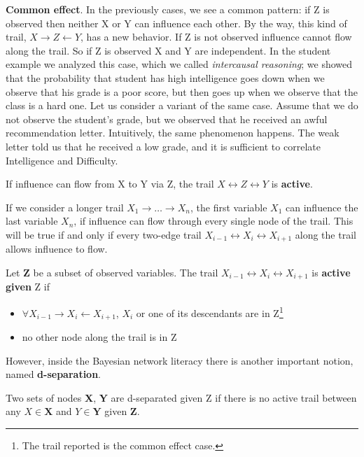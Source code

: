 \textbf{Common effect}. In the previously cases, we see a common pattern: if Z is observed then neither X or Y can influence each other. By the way, this kind of trail, 
$X \rightarrow Z \leftarrow Y$, has a new behavior. If Z is not observed influence cannot flow along the trail. So if Z is observed X and Y are independent. In the student example
we analyzed this case, which we called \textit{intercausal reasoning}; we showed that the probability that student has high intelligence goes down when we observe that his grade is 
a poor score, but then goes up when we observe that the class is a hard one. Let us consider a variant of the same case. Assume that we do not observe the student's grade, but we observed
that he received an awful recommendation letter. Intuitively, the same phenomenon happens. The weak letter told us that he received a low grade, and it is sufficient to 
correlate Intelligence and Difficulty.  
\begin{definition}
    If influence can flow from X to Y via Z, the trail $X \longleftrightarrow Z \longleftrightarrow Y$ is \textbf{active}.
\end{definition}
If we consider a longer trail $X_1 \rightarrow \dots \rightarrow X_n$, the first variable $X_1$ can influence the last variable $X_n$, if influence can flow through every single node of the trail.
This will be true if and only if every two-edge trail $X_{i-1} \longleftrightarrow X_i \longleftrightarrow X_{i+1}$ along the trail allows influence to flow.
\begin{definition}
    Let \textbf{Z} be a subset of observed variables. The trail $X_{i-1} \longleftrightarrow X_i \longleftrightarrow X_{i+1}$ is \textbf{active given} Z if
    \begin{itemize}
        \renewcommand{\labelitemi}{-}
        \item $\forall X_{i-1} \rightarrow X_i \leftarrow X_{i+1}$, $X_i$ or one of its descendants are in Z\footnote{The trail reported is the common effect case.}
        \item no other node along the trail is in Z
    \end{itemize}
\end{definition}
However, inside the Bayesian network literacy there is another important notion, named \textbf{d-separation}.
\begin{definition}
    Two sets of nodes \textbf{X}, \textbf{Y} are d-separated given Z if there is no active trail between any $X \in \mathbf{X}$ and $Y \in \mathbf{Y}$ given \textbf{Z}.
\end{definition}
